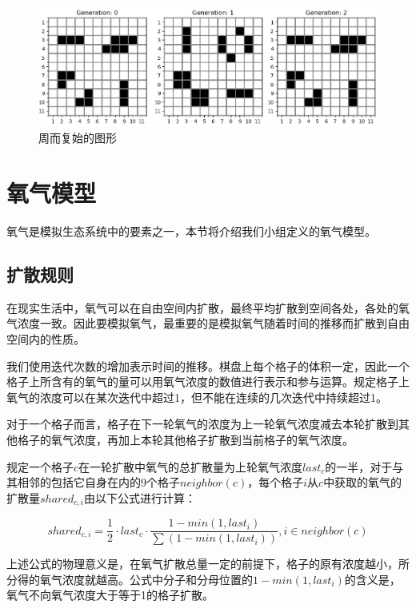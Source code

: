 \documentclass{ctexart}
\begin{document}
\begin{figure}[h]
  \centering
  \includegraphics[width=\textwidth]{classic-vibrating.png}
  \caption{周而复始的图形}
  \label{fig:classic-vibrating}
\end{figure}

\section{氧气模型}

氧气是模拟生态系统中的要素之一，本节将介绍我们小组定义的氧气模型。

\subsection{扩散规则}

在现实生活中，氧气可以在自由空间内扩散，最终平均扩散到空间各处，各处的氧气浓度一致。因此要模拟氧气，最重要的是模拟氧气随着时间的推移而扩散到自由空间内的性质。

我们使用迭代次数的增加表示时间的推移。棋盘上每个格子的体积一定，因此一个格子上所含有的氧气的量可以用氧气浓度的数值进行表示和参与运算。规定格子上氧气的浓度可以在某次迭代中超过1，但不能在连续的几次迭代中持续超过1。

对于一个格子而言，格子在下一轮氧气的浓度为上一轮氧气浓度减去本轮扩散到其他格子的氧气浓度，再加上本轮其他格子扩散到当前格子的氧气浓度。

规定一个格子$c$在一轮扩散中氧气的总扩散量为上轮氧气浓度$last_c$的一半，对于与其相邻的包括它自身在内的9个格子$neighbor(c)$，每个格子$i$从$c$中获取的氧气的扩散量$shared_{c, i}$由以下公式进行计算：

\begin{equation}
  \label{equ:share-oxygen}
  shared_{c, i} = \frac{1}{2} \cdot last_c \cdot \frac{1 - min(1, last_i)}{\sum (1 - min(1, last_i))}, i \in neighbor(c)
\end{equation}

上述公式的物理意义是，在氧气扩散总量一定的前提下，格子的原有浓度越小，所分得的氧气浓度就越高。公式中分子和分母位置的$1 - min(1, last_i)$的含义是，氧气不向氧气浓度大于等于1的格子扩散。
\end{document}
